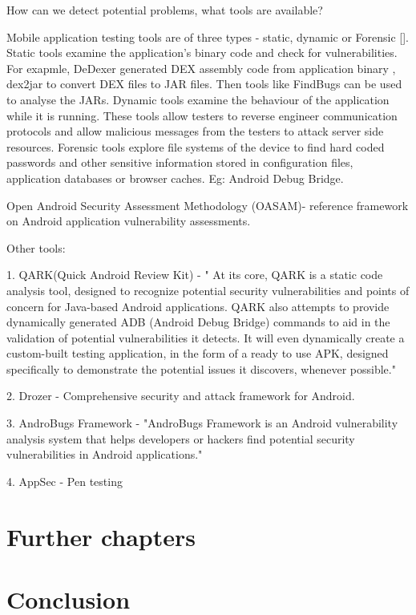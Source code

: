 \documentclass{mproj}
\begin{document}
How can we detect potential problems, what tools are available?

Mobile application testing tools are of three types - static, dynamic or Forensic []. Static tools examine the application's binary code and check for vulnerabilities. For exapmle, DeDexer generated DEX assembly code from application binary , dex2jar to convert DEX files to JAR files. Then tools like FindBugs can be used to analyse the JARs. Dynamic tools examine the behaviour of the application while it is running. These tools allow testers to reverse engineer communication protocols and allow malicious messages from the testers to attack server side resources. Forensic tools explore file systems of the device to find hard coded passwords and other sensitive information stored in configuration files, application databases or browser caches. Eg: Android Debug Bridge.


Open Android Security Assessment Methodology (OASAM)- reference framework on Android application vulnerability assessments.

Other tools:

1. QARK(Quick Android Review Kit) - " At its core, QARK is a static code analysis tool, designed to recognize potential security vulnerabilities and points of concern for Java-based Android applications. QARK also attempts to provide dynamically generated ADB (Android Debug Bridge) commands to aid in the validation of potential vulnerabilities it detects. It will even dynamically create a custom-built testing application, in the form of a ready to use APK, designed specifically to demonstrate the potential issues it discovers, whenever possible." 

2. Drozer - Comprehensive security and attack framework for Android.

3. AndroBugs Framework - "AndroBugs Framework is an Android vulnerability analysis system that helps developers or hackers find potential security vulnerabilities in Android applications."

4. AppSec - Pen testing



\chapter{Further chapters}


\chapter{Conclusion}\label{conclusion}
\end{document}
